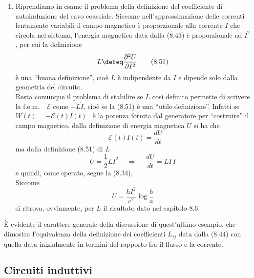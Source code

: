 \begin{enumerate}
  \item Riprendiamo in esame il problema della definizione del coefficiente di
    autoinduzione del cavo coassiale. Siccome nell'approssimazione delle
    correnti lentamente variabili il campo magnetico \`e proporzionale alla
    corrente $I$ che circola nel sistema, l'energia magnetica data dalla (8.43)
    \`e proporzionale ad $I^2$, per cui la definizione
    \begin{equation}
      L\defeq\frac{\partial^2U}{\partial I^2}
      \tag{8.51}
    \end{equation}
    \`e una ``buona definizione'', cio\`e $L$ \`e indipendente da $I$ e dipende
    solo dalla geometria del circuito.\\
    Resta comunque il problema di stabilire se $L$ cos\`i definito permette di
    scrivere la f.e.m.\ \ $\mathcal E$ come $-L\dot I$, cio\`e se la (8.51) \`e
    una ``utile definizione''. Infatti se \ $W(t)=-\mathcal E(t)I(t)$ \ \`e la
    potenza fornita dal generatore per ``costruire'' il campo magnetico, dalla
    definizione di energia magnetica $U$ si ha che
    \begin{equation}
      -\mathcal E(t)I(t)=\frac{dU}{dt}
      \tag{8.52}
    \end{equation}
    ma dalla definizione (8.51) di $L$
    \begin{equation}
      U=\frac{1}{2}LI^2\quad\ \Rightarrow\quad\ \frac{dU}{dt}=LI\,\dot I
      \tag{8.53}
    \end{equation}
    e quindi, come sperato, segue la (8.34).\\
    Siccome
    \begin{equation}
      U=\frac{hI^2}{c^2}\log\frac{b}{a}
      \tag{8.54}
    \end{equation}
    si ritrova, ovviamente, per $L$ il risultato dato nel capitolo 8.6.
\end{enumerate}
\`E evidente il carattere generale della discussione di quest'ultimo esempio,
che dimostra l'equivalenza della definizione dei coefficienti $L_{ij}$ data
dalla (8.44) con quella data inizialmente in termini del rapporto fra il flusso
e la corrente.

\subsection{Circuiti induttivi}


